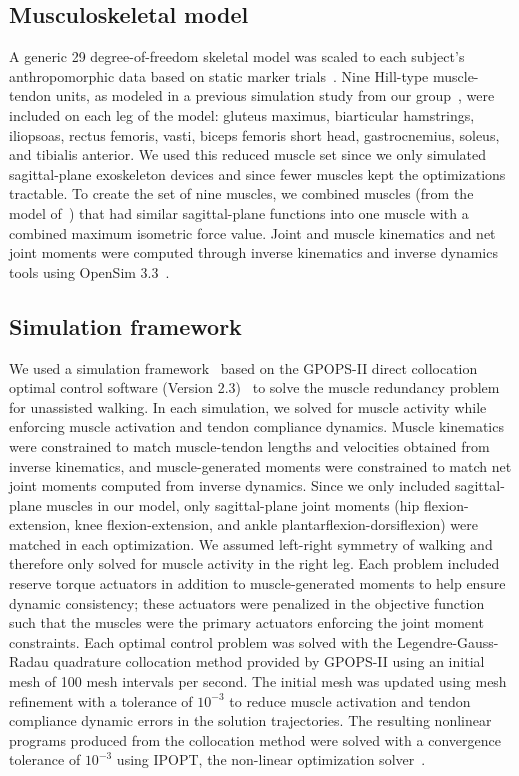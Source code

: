 \documentclass[10pt,letterpaper]{article}
\begin{document}
\subsection*{Musculoskeletal model}
A generic 29 degree-of-freedom skeletal model was scaled to each subject’s anthropomorphic data based on static marker trials~\cite{Rajagopal:2016}. Nine Hill-type muscle-tendon units, as modeled in a previous simulation study from our group~\cite{Ong:2019}, were included on each leg of the model: gluteus maximus, biarticular hamstrings, iliopsoas, rectus femoris, vasti, biceps femoris short head, gastrocnemius, soleus, and tibialis anterior. We used this reduced muscle set since we only simulated sagittal-plane exoskeleton devices and since fewer muscles kept the optimizations tractable. To create the set of nine muscles, we combined muscles (from the model of~\cite{Rajagopal:2016}) that had similar sagittal-plane functions into one muscle with a combined maximum isometric force value. Joint and muscle kinematics and net joint moments were computed through inverse kinematics and inverse dynamics tools using OpenSim 3.3~\cite{Delp:2007}.

\subsection*{Simulation framework}
We used a simulation framework~\cite{DeGroote:2016} based on the GPOPS-II direct collocation optimal control software (Version 2.3)~\cite{Patterson:2014} to solve the muscle redundancy problem for unassisted walking. In each simulation, we solved for muscle activity while enforcing muscle activation and tendon compliance dynamics. Muscle kinematics were constrained to match muscle-tendon lengths and velocities obtained from inverse kinematics, and muscle-generated moments were constrained to match net joint moments computed from inverse dynamics. Since we only included sagittal-plane muscles in our model, only sagittal-plane joint moments (hip flexion-extension, knee flexion-extension, and ankle plantarflexion-dorsiflexion) were matched in each optimization. We assumed left-right symmetry of walking and therefore only solved for muscle activity in the right leg. Each problem included reserve torque actuators in addition to muscle-generated moments to help ensure dynamic consistency; these actuators were penalized in the objective function such that the muscles were the primary actuators enforcing the joint moment constraints. Each optimal control problem was solved with the Legendre-Gauss-Radau quadrature collocation method provided by GPOPS-II using an initial mesh of 100 mesh intervals per second. The initial mesh was updated using mesh refinement with a tolerance of $10^{-3}$ to reduce muscle activation and tendon compliance dynamic errors in the solution trajectories. The resulting nonlinear programs produced from the collocation method were solved with a convergence tolerance of $10^{-3}$ using IPOPT, the non-linear optimization solver~\cite{Wachter:2006}.
\end{document}
